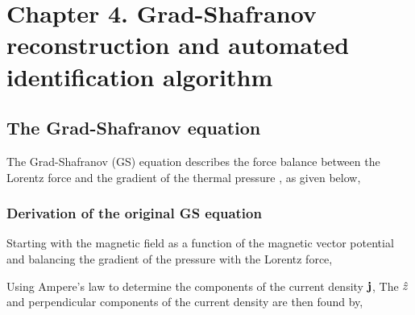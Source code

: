 \chapter{Chapter 4. Grad-Shafranov reconstruction and automated identification algorithm} \label{ch:ch4} %

\section{The Grad-Shafranov equation}
%
The Grad-Shafranov (GS) equation describes the force balance between the Lorentz force and the gradient of the thermal pressure \citep{Sonnerup:1996, Hau:1999}, as given below,

\subsection{Derivation of the original GS equation}
Starting with the magnetic field as a function of the magnetic vector potential and balancing the gradient of the pressure with the Lorentz force,

\noindent Using Ampere's law to determine the components of the current density $\mathbf{j}$,
The $\hat{z}$ and perpendicular components of the current density are then found by,

